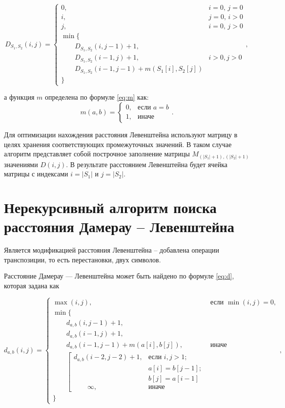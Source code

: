 \begin{equation}
\label{eq:D}
D_{S_1, S_2}(i, j) = \begin{cases}
0, &\text{$i = 0$, $j = 0$}\\
i, &\text{$j = 0$, $i > 0$}\\
j, &\text{$i = 0$, $j > 0$}\\
\min \lbrace\\
\qquad D_{S_1, S_2}(i, j-1) + 1,\\
\qquad D_{S_1, S_2}(i-1, j) + 1, &\text{$i > 0, j > 0$}\\
\qquad D_{S_1, S_2}(i-1, j-1) + m(S_1[i], S_2[j])\\
\rbrace
\end{cases},
\end{equation}

а функция $m$ определена по формуле \ref{eq:m} как:
\begin{equation}
	\label{eq:m}
	m(a, b) = \begin{cases}
		0, &\text{если $a = b$}\\
		1, &\text{иначе}
	\end{cases}.
\end{equation}

Для оптимизации нахождения расстояния Левенштейна используют матрицу в целях хранения соответствующих промежуточных значений.
В таком случае алгоритм представляет собой построчное заполнение матрицы $M_{(|S_1|+1), (|S_2|+1)}$ значениями $D(i, j)$. В результате расстоянием Левенштейна будет ячейка матрицы с индексами $i = |S_1|$ и $j = |S_2|$.

\section{Нерекурсивный алгоритм поиска расстояния Дамерау -- Левенштейна}

Является модификацией расстояния Левенштейна -- добавлена операции транспозиции, то есть перестановки, двух символов.

Расстояние Дамерау — Левенштейна может быть найдено по формуле \ref{eq:d}, которая задана как


\begin{equation}
	\label{eq:d}
	d_{a,b}(i, j) = \begin{cases}
		\max(i, j), &\text{если }\min(i, j) = 0,\\
		\min \lbrace \\
			\qquad d_{a,b}(i, j-1) + 1,\\
			\qquad d_{a,b}(i-1, j) + 1,\\
			\qquad d_{a,b}(i-1, j-1) + m(a[i], b[j]), &\text{иначе}\\
			\qquad \left[ \begin{array}{cc}d_{a,b}(i-2, j-2) + 1, &\text{если }i,j > 1;\\
			\qquad &\text{}a[i] = b[j-1]; \\
			\qquad &\text{}b[j] = a[i-1]\\
			\qquad \infty, & \text{иначе}\end{array}\right.\\
		\rbrace
		\end{cases},
\end{equation}

